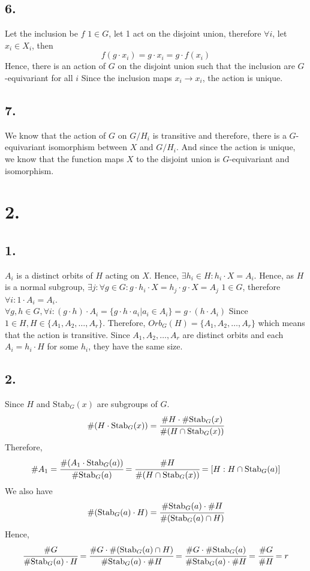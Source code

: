 \documentclass[11pt]{article}
\begin{document}
\subsection*{6.}
Let the inclusion be $f$
$1 \in G$, let 1 act on the disjoint union, therefore
$\forall i$, let $x_i \in X_i$, then 
\[
    f(g \cdot x_i) = g \cdot x_i = g \cdot f(x_i)    
\]
Hence, there is an action of $G$ on the disjoint union such that the inclusion are $G$-equivariant for all $i$
Since the inclusion maps $x_i \to x_i$, the action is unique.
\subsection*{7.}
We know that the action of $G$ on $G/H_i$ is transitive 
and therefore, there is a $G$-equivariant isomorphism between $X$ and $G/H_i$. And since the action is unique, 
we know that the function maps $X$ to the disjoint union is $G$-equivariant and isomorphism.
\pagebreak
\section*{2.}
\subsection*{1.}
$A_i$ is a distinct orbits of $H$ acting on $X$. Hence, $\exists h_i \in H: h_i \cdot X = A_i$.
Hence, as $H$ is a normal subgroup, $\exists j: \forall g \in G: g \cdot h_i \cdot X = h_j \cdot g \cdot X = A_j$
$1 \in G$, therefore $\forall i: 1 \cdot A_i = A_i$. \\
$\forall g, h \in G, \forall i: (g \cdot h) \cdot A_i = \{g \cdot h \cdot a_i | a_i \in A_i\} = g \cdot (h \cdot A_i)$
Since $1 \in H, H \in \{A_1, A_2, \ldots, A_r\}$. Therefore, $Orb_G(H) = \{A_1, A_2, \ldots ,A_r\}$ 
which means that the action is transitive. 
Since $A_1, A_2, \ldots, A_r$ are distinct orbits and each $A_i = h_i \cdot H$ for some $h_i$, they have the same size. 
\subsection*{2.}
Since $H$ and $\text{Stab}_G(x)$ are subgroups of $G$.
\[
    \#(H \cdot \text{Stab}_G(x)) = \cfrac{\#H \cdot \#\text{Stab}_G(x)}{\#(H \cap \text{Stab}_G(x))}
\]
Therefore, 
\[
    \#A_1
    = \cfrac{\#(A_1 \cdot \text{Stab}_G(a))}{\#\text{Stab}_G(a)}
    = \cfrac{\#H }{\#(H \cap \text{Stab}_G(x))}
    = [H : H \cap \text{Stab}_G(a)]
\]
We also have
\[
    \#(\text{Stab}_G(a) \cdot H) = \cfrac{\#\text{Stab}_G(a) \cdot \#H}{\#(\text{Stab}_G(a) \cap H)}    
\]
Hence, 
\[
    \cfrac{\#G}{\#\text{Stab}_G(a) \cdot H} 
    = \cfrac{\#G \cdot \#(\text{Stab}_G(a) \cap H)}{\#\text{Stab}_G(a) \cdot \#H} 
    = \cfrac{\#G \cdot \#\text{Stab}_G(a)}{\#\text{Stab}_G(a) \cdot \#H} 
    = \cfrac{\#G}{\#H} = r    
\]
\pagebreak
\end{document}
